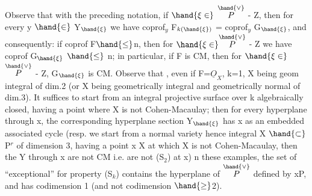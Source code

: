 
Observe that with the preceding notation, if $\hand{\xi\in}$ $\overset{\hand{\vee}}{P}$ - Z, then for every
y $\hand{\in}$ Y$_{\hand{\xi}}$ we have coprof$_y$ F$_{k(\hand{\xi})}$ = coprof$_y$ G$_{\hand{\xi}}$, and consequently: if coprof F$\hand{\leq}$n,
then for $\hand{\xi\in}\overset{\hand{\vee}}{P}$ - Z we have coprof G$_{\hand{\xi}}$ $\hand{\leq}$ n; in particular, if F is CM, then
for $\hand{\xi\in}$ $\overset{\hand{\vee}}{P}$ - Z, G$_{\hand{\xi}}$ is CM. 
 Observe that  
, even if F=$\underline{O}_X$, k=1, X being geom integral of dim.2 (or  X being
geometrically integral and geometrically normal of dim.3). It suffices
to start from an integral projective surface   over k algebraically
closed, having a point  where X is not Cohen-Macaulay; then for every
hyperplane through x, the corresponding hyperplane section Y$_{\hand{\xi}}$ has
x as an embedded associated cycle (resp. we start from a normal variety\hand{,} \hand{(}hence
 integral X $\hand{\subset}$ P$^r$ of dimension 3, having a point x \hand{$\in$} X at which X is not
Cohen-Macaulay, then the Y through x are not  CM i.e. are
not (S$_2$) at x) n these examples, the set of \hand{$\xi$} “exceptional”
for property (S$_k$) contains the hyperplane of $\overset{\hand{\vee}}{P}$ defined by x\hand{$\in$}P, and has
codimension 1 (and not codimension $\hand{\geq}$2). 

